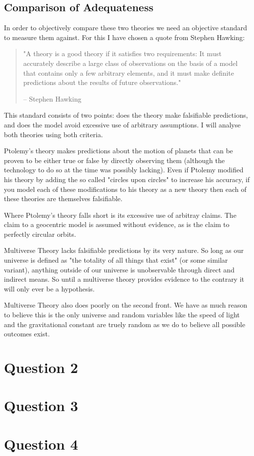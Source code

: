 \documentclass[10pt,a4paper]{article}
\begin{document}
\subsection*{Comparison of Adequateness}
In order to objectively compare these two theories we need an objective standard to measure them against. For this I have chosen a quote from Stephen Hawking:

\begin{quote}
	"A theory is a good theory if it satisfies two requirements: It must accurately describe a large class of observations on the basis of a model that contains only a few arbitrary elements, and it must make definite predictions about the results of future observations."

	-- Stephen Hawking
\end{quote}

This standard consists of two points: does the theory make falsifiable predictions, and does the model avoid excessive use of arbitrary assumptions. I will analyse both theories using both criteria.

Ptolemy's theory makes predictions about the motion of planets that can be proven to be either true or false by directly observing them (although the technology to do so at the time was possibly lacking). Even if Ptolemy modified his theory by adding the so called "circles upon circles" to increase his accuracy, if you model each of these modifications to his theory as a new theory then each of these theories are themselves falsifiable.

Where Ptolemy's theory falls short is its excessive use of arbitray claims. The claim to a geocentric model is assumed without evidence, as is the claim to perfectly circular orbits.

Multiverse Theory lacks falsifiable predictions by its very nature. So long as our universe is defined as "the totality of all things that exist" (or some similar variant), anything outside of our universe is unobservable through direct and indirect means. So until a multiverse theory provides evidence to the contrary it will only ever be a hypothesis.

Multiverse Theory also does poorly on the second front. We have as much reason to believe this is the only universe and random variables like the speed of light and the gravitational constant are truely random as we do to believe all possible outcomes exist.

\section*{Question 2}
\section*{Question 3}
\section*{Question 4}
\end{document}
